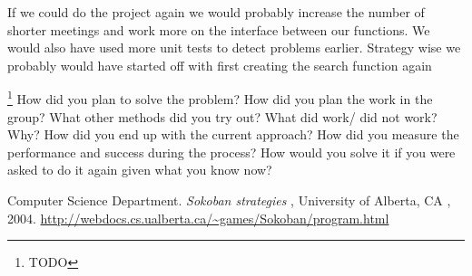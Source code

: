 \documentclass{article}
\begin{document}
If we could do the project again we would probably increase the number of shorter meetings and work more on the interface between our functions. We would also have used more unit tests to detect problems earlier.
Strategy wise we probably would have started off with first creating the search function again


\footnote { TODO}
How did you plan to solve the problem? How did you plan the work in the group? What other methods did you try out? What did work/ did not work? Why? How did you end up with the current approach? How did you measure the performance and success during the process? How would you solve it if you were asked to do it again given what you know now? 


\begin{thebibliography}{9}
Computer Science Department.
\textit{Sokoban strategies} ,
University of Alberta, CA , 2004.
\url {http://webdocs.cs.ualberta.ca/~games/Sokoban/program.html}
\end {thebibliography}
\end{document}
